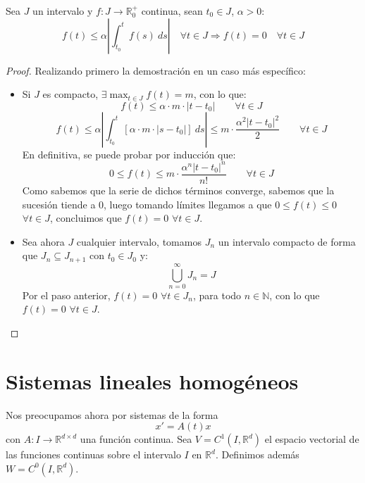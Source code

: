 \begin{lema}\label{lema:unicidad_teo}
    Sea $J$ un intervalo y $f:J\rightarrow \mathbb{R}^+_0$ continua, sean $t_0\in J$, $\alpha >0$:
    \begin{equation*}
        f(t) \leq \alpha\left|\int_{t_0}^{t} f(s)~ds \right| \quad \forall t\in J \Longrightarrow f(t) = 0 \quad \forall t\in J
    \end{equation*}
    \begin{proof}
        Realizando primero la demostración en un caso más específico:
        \begin{itemize}
            \item Si $J$ es compacto, $\exists \max_{t\in J} f(t) = m$, con lo que:
                \begin{equation*}
                    f(t) \leq \alpha \cdot m\cdot  |t-t_0| \qquad \forall t\in J
                \end{equation*}
                \begin{equation*}
                    f(t) \leq \alpha \left|\int_{t_0}^{t} [\alpha \cdot m\cdot  |s-t_0|]~ds \right| \leq m\cdot  \dfrac{\alpha^2 {|t-t_0|}^{2}}{2}\qquad \forall t\in J
                \end{equation*}
                En definitiva, se puede probar por inducción que:
                \begin{equation*}
                    0\leq f(t) \leq m\cdot  \dfrac{\alpha^n {|t-t_0|}^{n}}{n!} \qquad \forall t\in J
                \end{equation*}
                Como sabemos que la serie de dichos términos converge, sabemos que la sucesión tiende a 0, luego tomando límites llegamos a que $0\leq f(t) \leq 0$ $\forall t\in J$, concluimos que $f(t) = 0$ $\forall t\in J$.
            \item Sea ahora $J$ cualquier intervalo, tomamos $J_n$ un intervalo compacto de forma que $J_n \subseteq J_{n+1}$ con $t_0 \in J_0$ y:
                \begin{equation*}
                    \bigcup_{n=0}^\infty J_n = J
                \end{equation*}
                Por el paso anterior, $f(t) = 0$ $\forall t\in J_n$, para todo $n\in \mathbb{N}$, con lo que $f(t) = 0$ $\forall t\in J$.
        \end{itemize}
    \end{proof}
\end{lema}

\section{Sistemas lineales homogéneos}
\noindent
Nos preocupamos ahora por sistemas de la forma
\begin{equation*}\label{eq:lin_sup_h}
    x' = A(t) x
\end{equation*}
con $A:I\rightarrow\mathbb{R}^{d\times d}$ una función continua. Sea $V = C^1(I,\mathbb{R}^d)$ el espacio vectorial de las funciones continuas sobre el intervalo $I$ en $\mathbb{R}^d$. Definimos además $W=C^0(I,\mathbb{R}^d)$.

